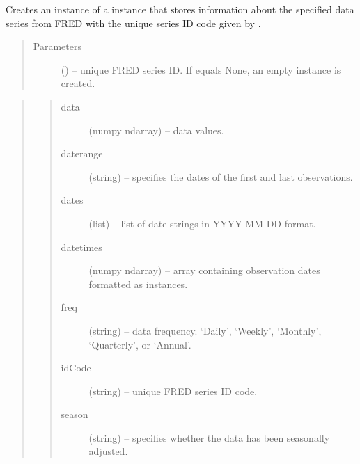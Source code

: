 \documentclass[letterpaper,10pt,openany,oneside,english]{sphinxmanual}
\begin{document}
\begin{fulllineitems}
\label{\detokenize{series_class:fredpy.series}}
Creates an instance of a {\hyperref[\detokenize{series_class:fredpy.series}]{}} instance that stores information about the specified data series from FRED with the unique series ID code given by .
\begin{quote}\begin{description}
\item[{Parameters}] \leavevmode
{} (\href{https://docs.python.org/2/library/string.html\#module-string}{}) -- unique FRED series ID. If  equals None, an empty {\hyperref[\detokenize{series_class:fredpy.series}]{}} instance is created.

\end{description}\end{quote}

\begin{quote}
\begin{quote}\begin{description}
\item[{data}] \leavevmode
(numpy ndarray) --  data values.

\item[{daterange}] \leavevmode
(string) -- specifies the dates of the first and last observations.

\item[{dates}] \leavevmode
(list) -- list of date strings in YYYY-MM-DD format.

\item[{datetimes}] \leavevmode
(numpy ndarray) -- array containing observation dates formatted as \href{https://docs.python.org/2/library/datetime.html\#datetime.datetime}{} instances.

\item[{freq}] \leavevmode
(string) -- data frequency. `Daily', `Weekly', `Monthly', `Quarterly', or `Annual'.

\item[{idCode}] \leavevmode
(string) -- unique FRED series ID code.

\item[{season}] \leavevmode
(string) -- specifies whether the data has been seasonally adjusted.


\end{description}
\end{quote}
\end{quote}
\end{fulllineitems}
\end{document}
